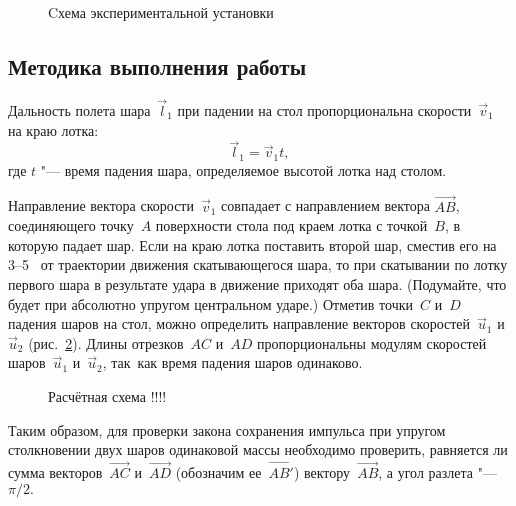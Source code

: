\documentclass[a4paper, 12pt]{extarticle}
\begin{document}
\begin{figure}[h]
\begin{center}
\end{center}
\caption{Cхема экспериментальной установки \label{fig:m4-equipment}}
\end{figure} %

\subsection{Методика выполнения работы}


Дальность полета шара~$\vec l_1$ при падении на стол пропорциональна скорости~$\vec v_1$ на краю лотка:
\[
\vec l_1 = \vec v_1 t,
\]
где $t$ "--- время падения шара, определяемое высотой лотка над столом.

Направление вектора скорости~$\vec v_1$ совпадает с направлением вектора $\vec{AB}$, соединяющего точку~$A$ поверхности стола под краем лотка с точкой~$B$, в которую падает шар. Если на краю лотка поставить второй шар, сместив его на 3--5~ от траектории движения скатывающегося шара, то при скатывании по лотку первого шара в результате удара в движение приходят оба шара. (Подумайте, что будет при абсолютно упругом центральном ударе.) Отметив точки~$C$ и~$D$ падения шаров на стол, можно определить направление векторов скоростей~$\vec u_1$ и~$\vec u_2$ (рис.~\ref{fig:m4-impulse-diagram}). Длины отрезков~$AC$ и~$AD$ пропорциональны модулям скоростей шаров~$\vec u_1$ и~$\vec u_2$, так~как время падения шаров одинаково. %

\begin{figure}[h]
\begin{center}
\end{center}
\caption{Расчётная схема \Huge !!!!\label{fig:m4-impulse-diagram}}
\end{figure}

Таким образом, для проверки закона сохранения импульса при упругом столкновении двух шаров одинаковой массы необходимо проверить, равняется ли сумма векторов~$\vec{AC}$ и~$\vec{AD}$ (обозначим ее~$\vec{AB'}$) вектору~$\vec{AB}$, а угол разлета "--- $\pi/2.$
\end{document}
